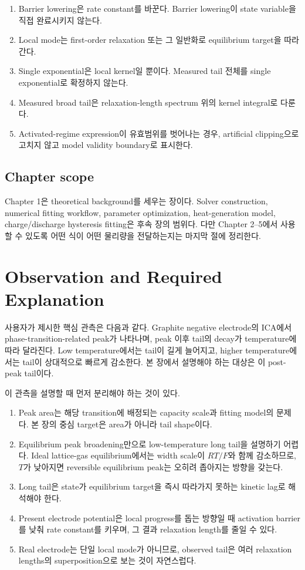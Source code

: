 \documentclass[11pt]{article}
\begin{document}
\begin{enumerate}[label=\textbf{C\arabic*.}]
\item Barrier lowering은 rate constant를 바꾼다. Barrier lowering이 state variable을 직접 완료시키지 않는다.
\item Local mode는 first-order relaxation 또는 그 일반화로 equilibrium target을 따라간다.
\item Single exponential은 local kernel일 뿐이다. Measured tail 전체를 single exponential로 확정하지 않는다.
\item Measured broad tail은 relaxation-length spectrum 위의 kernel integral로 다룬다.
\item Activated-regime expression이 유효범위를 벗어나는 경우, artificial clipping으로 고치지 않고 model validity boundary로 표시한다.
\end{enumerate}

\subsection{Chapter scope}\label{subsec:scope}

Chapter 1은 theoretical background를 세우는 장이다. Solver construction, numerical fitting workflow,
parameter optimization, heat-generation model, charge/discharge hysteresis fitting은 후속 장의 범위다.
다만 Chapter 2--5에서 사용할 수 있도록 어떤 식이 어떤 물리량을 전달하는지는 마지막 절에 정리한다.

\section{Observation and Required Explanation}\label{sec:observation}

사용자가 제시한 핵심 관측은 다음과 같다. Graphite negative electrode의 ICA에서
phase-transition-related peak가 나타나며, peak 이후 tail의 decay가 temperature에 따라 달라진다.
Low temperature에서는 tail이 길게 늘어지고, higher temperature에서는 tail이 상대적으로 빠르게
감소한다. 본 장에서 설명해야 하는 대상은 이 post-peak tail이다.

이 관측을 설명할 때 먼저 분리해야 하는 것이 있다.

\begin{enumerate}[label=\textbf{O\arabic*.}]
\item Peak area는 해당 transition에 배정되는 capacity scale과 fitting model의 문제다. 본 장의 중심 target은 area가 아니라 tail shape이다.
\item Equilibrium peak broadening만으로 low-temperature long tail을 설명하기 어렵다. Ideal lattice-gas equilibrium에서는 width scale이 \(RT/F\)와 함께 감소하므로, \(T\)가 낮아지면 reversible equilibrium peak는 오히려 좁아지는 방향을 갖는다.
\item Long tail은 state가 equilibrium target을 즉시 따라가지 못하는 kinetic lag로 해석해야 한다.
\item Present electrode potential은 local progress를 돕는 방향일 때 activation barrier를 낮춰 rate constant를 키우며, 그 결과 relaxation length를 줄일 수 있다.
\item Real electrode는 단일 local mode가 아니므로, observed tail은 여러 relaxation lengths의 superposition으로 보는 것이 자연스럽다.
\end{enumerate}
\end{document}
